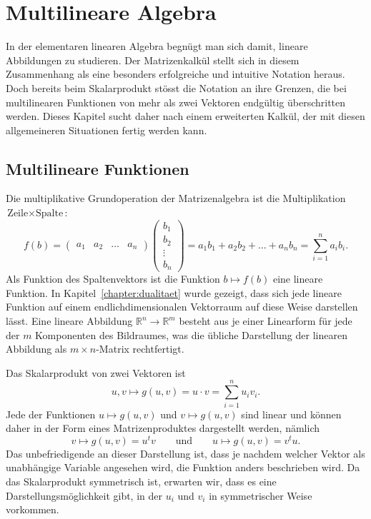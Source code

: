 %
%
%
\section{Multilineare Algebra%
\label{section:multilinearealgebra}}
In der elementaren linearen Algebra begnügt man sich damit, lineare
Abbildungen zu studieren.
Der Matrizenkalkül stellt sich in diesem Zusammenhang als eine
besonders erfolgreiche und intuitive Notation heraus.
Doch bereits beim Skalarprodukt stösst die Notation an ihre Grenzen,
die bei multilinearen Funktionen von mehr als zwei Vektoren
endgültig überschritten werden.
Dieses Kapitel sucht daher nach einem erweiterten Kalkül, der mit
diesen allgemeineren Situationen fertig werden kann.

\subsection{Multilineare Funktionen%
\label{subsection:multilinearefunktionen}}
Die multiplikative Grundoperation der Matrizenalgebra ist die 
Multiplikation $\text{Zeile}\times \text{Spalte}$:
\[
f(b)
=
\begin{pmatrix}a_1&a_2&\dots&a_n\end{pmatrix}
\begin{pmatrix}
b_1\\b_2\\\vdots\\b_n
\end{pmatrix}
=
a_1b_1+a_2b_2+\dots+a_nb_n
=
\sum_{i=1}^n a_ib_i.
\]
Als Funktion des Spaltenvektors ist die Funktion $b\mapsto f(b)$ eine
lineare Funktion.
In Kapitel~\ref{chapter:dualitaet} wurde gezeigt, dass sich jede lineare
Funktion auf einem endlichdimensionalen Vektorraum auf diese Weise
darstellen lässt.
Eine lineare Abbildung $\mathbb R^n\to\mathbb R^m$ besteht aus je einer
Linearform für jede der $m$ Komponenten des Bildraumes, was die übliche
Darstellung der linearen Abbildung als $m\times n$-Matrix rechtfertigt.

Das Skalarprodukt von zwei Vektoren ist 
\[
u,v\mapsto g(u,v)=u\cdot v = \sum_{i=1}^n u_iv_i.
\]
Jede der Funktionen $u\mapsto g(u,v)$ und $v\mapsto g(u,v)$ sind
linear und können daher in der Form eines Matrizenproduktes dargestellt
werden, nämlich
\[
v\mapsto g(u,v) = u^tv
\qquad\text{und}\qquad
u\mapsto g(u,v) = v^tu.
\]
Das unbefriedigende an dieser Darstellung ist, dass je nachdem welcher
Vektor als unabhängige Variable angesehen wird, die Funktion anders
beschrieben wird.
Da das Skalarprodukt symmetrisch ist, erwarten wir, dass es eine
Darstellungsmöglichkeit gibt, in der $u_i$ und $v_i$ in symmetrischer
Weise vorkommen.

